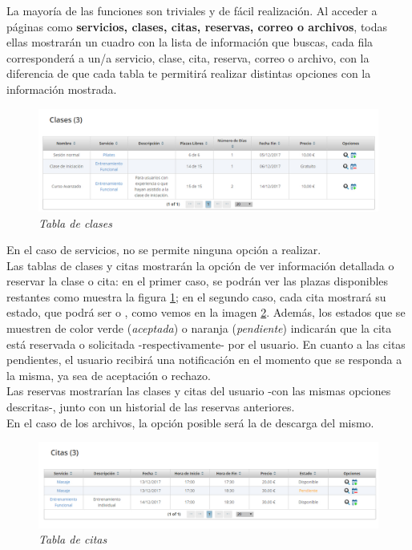 La mayoría de las funciones son triviales y de fácil realización. Al acceder a páginas como \textbf{servicios, clases, citas, reservas, correo o archivos}, todas ellas mostrarán un cuadro con la lista de información que buscas, cada fila corresponderá a un/a servicio, clase, cita, reserva, correo o archivo, con la diferencia de que cada tabla te permitirá realizar distintas opciones con la información mostrada. \\

\begin{figure}
\centering
  \includegraphics[scale=.35]{img/manual/tabla-clases.jpg}
  \caption{\textit{Tabla de clases}}
  \label{fig:tabla-clases}
\end{figure}

En el caso de servicios, no se permite ninguna opción a realizar. \\

Las tablas de clases y citas mostrarán la opción de ver información detallada o reservar la clase o cita: en el primer caso, se podrán ver las plazas disponibles restantes como muestra la figura \ref{fig:tabla-clases}; en el segundo caso, cada cita mostrará su estado, que podrá ser  o , como vemos en la imagen \ref{fig:tabla-citas}. Además, los estados que se muestren de color verde (\textit{aceptada}) o naranja (\textit{pendiente}) indicarán que la cita está reservada o solicitada -respectivamente- por el usuario. En cuanto a las citas pendientes, el usuario recibirá una notificación en el momento que se responda a la misma, ya sea de aceptación o rechazo. \\

Las reservas mostrarían las clases y citas del usuario -con las mismas opciones descritas-, junto con un historial de las reservas anteriores. \\

En el caso de los archivos, la opción posible será la de descarga del mismo. \\

\begin{figure}
\centering
  \includegraphics[scale=.35]{img/manual/tabla-citas.jpg}
  \caption{\textit{Tabla de citas}}
  \label{fig:tabla-citas}
\end{figure}

